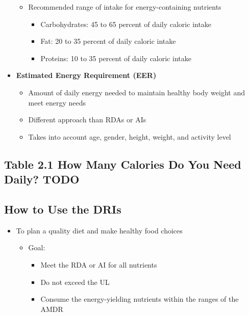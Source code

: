 \documentclass[12pt]{article}
\begin{document}
\begin{itemize}
\begin{itemize}
                        \item Recommended range of intake for energy-containing nutrients
                            \begin{itemize}
                                \item Carbohydrates: 45 to 65 percent of daily caloric intake
                                \item Fat: 20 to 35 percent of daily caloric intake
                                \item Proteins: 10 to 35 percent of daily caloric intake
                            \end{itemize}
                    \end{itemize}
                \item \textbf{Estimated Energy Requirement (EER)}
                    \begin{itemize}
                        \item Amount of daily energy needed to maintain healthy body weight and meet energy needs
                        \item Different approach than RDAs or AIs
                        \item Takes into account age, gender, height, weight, and activity level
                    \end{itemize}
            \end{itemize}
        
        \subsection {Table 2.1 How Many Calories Do You Need Daily? TODO}
        \subsection{How to Use the DRIs}
            \begin{itemize}
                \item To plan a quality diet and make healthy food choices
                    \begin{itemize}
                        \item Goal:
                            \begin{itemize}
                                \item Meet the RDA or AI for all nutrients
                                \item Do not exceed the UL
                                \item Consume the energy-yielding nutrients within the ranges of the AMDR
                            \end{itemize}
                    \end{itemize}
            \end{itemize}
        
\end{document}
